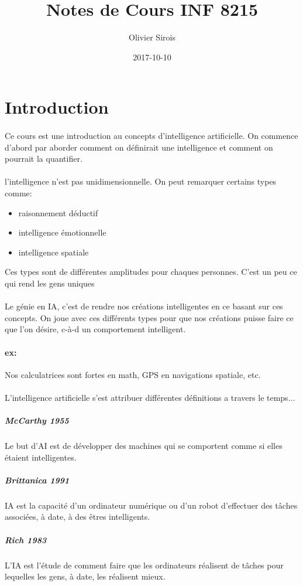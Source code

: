 \documentclass[oneside]{book}
\title{Notes de Cours INF 8215}
\date{2017-10-10}
\author{Olivier Sirois}
\begin{document}
\maketitle
\newpage


\section{Introduction}
\paragraph{}
Ce cours est une introduction au concepts d'intelligence artificielle. On commence d'abord par aborder comment on définirait une intelligence et comment on pourrait la quantifier.
\paragraph{}
l'intelligence n'est pas unidimensionnelle. On peut remarquer certains types comme:
\begin{itemize}
\item raisonnement déductif
\item intelligence émotionnelle
\item intelligence spatiale
\end{itemize}
Ces types sont de différentes amplitudes pour chaques personnes. C'est un peu ce qui rend les gens uniques

\paragraph{}
Le génie en IA, c'est de rendre nos créations intelligentes en ce basant sur ces concepts. On joue avec ces différents types pour que nos créations puisse faire ce que l'on désire, c-à-d un comportement intelligent.
\paragraph{ex:}
Nos calculatrices sont fortes en math, GPS en navigations spatiale, etc.
\paragraph{}
L'intelligence artificielle s'est attribuer différentes définitions a travers le temps...
\subparagraph{McCarthy 1955}
Le but d’AI est de développer des machines qui se comportent
comme si elles étaient intelligentes.
\subparagraph{Brittanica 1991}
IA est la capacité d’un ordinateur numérique ou d’un robot
d’effectuer des tâches associées, à date, à des êtres intelligents.
\subparagraph{Rich 1983}
L’IA est l’étude de comment faire que les ordinateurs réalisent de
tâches pour lequelles les gens, à date, les réalisent mieux.
\end{document}
